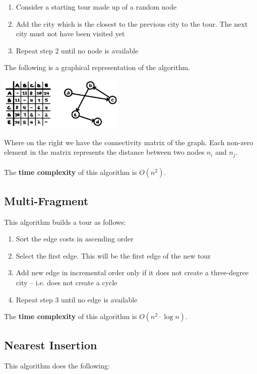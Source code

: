 \documentclass{article}
\begin{document}
\begin{enumerate}
	\item Consider a starting tour made up of a random node
	\item Add the city which is the closest to the previous city to the tour. The next city must not have been visited yet
	\item Repeat step 2 until no node is available
\end{enumerate}
The following is a graphical representation of the algorithm.\\

\begin{center}
	\includegraphics[width=6cm]{nn.png}
\end{center}
\vspace{.3cm}
Where on the right we have the connectivity matrix of the graph. Each non-zero element in the matrix represents the distance between two nodes $n_i$ and $n_j$. \\ \\
The \textbf{time complexity} of this algorithm is $O(n^2)$.

\subsection{Multi-Fragment}
This algorithm builds a tour as follows:

\begin{enumerate}
	\item Sort the edge costs in ascending order
	\item Select the first edge. This will be the first edge of the new tour
	\item Add new edge in incremental order only if it does not create a three-degree city -- i.e. does not create a cycle
	\item Repeat step 3 until no edge is available
\end{enumerate}
The \textbf{time complexity} of this algorithm is $O(n^2 \cdot \log n)$.

\subsection{Nearest Insertion}
This algorithm does the following:
\end{document}
